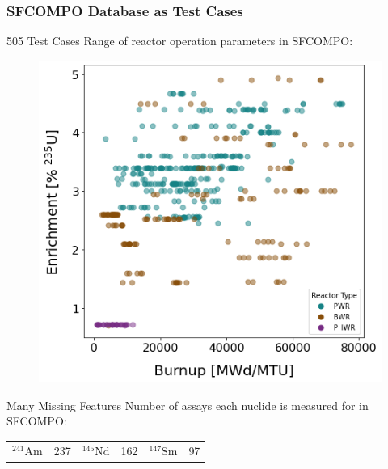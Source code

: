 \begin{frame}
  \frametitle{SFCOMPO Database as Test Cases}
  \begin{adjustwidth}{-15pt}{0pt}
  \begin{minipage}{0.45\textwidth}
    \begin{block}{505 Test Cases}
      Range of reactor operation parameters in SFCOMPO:
      \begin{figure}
        \centering
        \includegraphics[width=\textwidth]{./figures/sfcompo_scatter_viz.png}
      \end{figure}
    \end{block}
  \end{minipage}%
  \hfill
  \begin{minipage}{0.55\textwidth}
    \begin{block}{Many Missing Features}
      Number of assays each nuclide is measured for in SFCOMPO:
      \begin{table}
        \footnotesize
        \centering
        \renewcommand{\arraystretch}{1.3}
        \begin{tabular}{>{\raggedleft}m{0.36in}
                                      m{0.18in}
                        >{\raggedleft}m{0.36in}
                                      m{0.18in}
                        >{\raggedleft}m{0.36in}
                                      m{0.18in}}
          \toprule
          \rowcolor[gray]{0.88} ${}^{241}\text{Am}$  & 237 & ${}^{145}\text{Nd}$ & 162 & ${}^{147}\text{Sm}$ & 97  \\  

\end{tabular}
\end{table}
\end{block}
\end{minipage}
\end{adjustwidth}
\end{frame}
